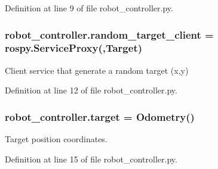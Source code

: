 Definition at line 9 of file robot\+\_\+controller.\+py.

\subsubsection[{\texorpdfstring{random\+\_\+target\+\_\+client}{random_target_client}}]{\setlength{\rightskip}{0pt plus 5cm}robot\+\_\+controller.\+random\+\_\+target\+\_\+client = rospy.\+Service\+Proxy(\textquotesingle{},Target)}\hypertarget{namespacerobot__controller_a7d2c9b24ddf4d6fc069f7bae05ba8935}{}\label{namespacerobot__controller_a7d2c9b24ddf4d6fc069f7bae05ba8935}


Client service that generate a random target (x,y) 



Definition at line 12 of file robot\+\_\+controller.\+py.

\subsubsection[{\texorpdfstring{target}{target}}]{\setlength{\rightskip}{0pt plus 5cm}robot\+\_\+controller.\+target = Odometry()}\hypertarget{namespacerobot__controller_af6e678d9713033f52d7fb793cc429b98}{}\label{namespacerobot__controller_af6e678d9713033f52d7fb793cc429b98}


Target position coordinates. 



Definition at line 15 of file robot\+\_\+controller.\+py.

